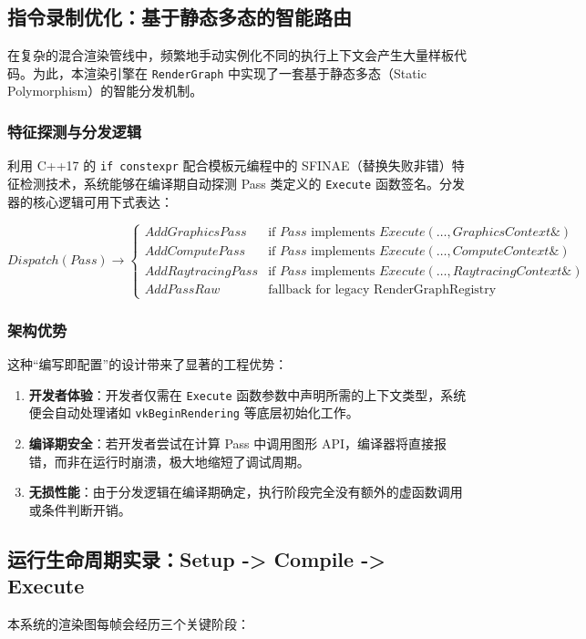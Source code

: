 \subsection{指令录制优化：基于静态多态的智能路由}
在复杂的混合渲染管线中，频繁地手动实例化不同的执行上下文会产生大量样板代码。为此，本渲染引擎在 \texttt{RenderGraph} 中实现了一套基于静态多态（Static Polymorphism）的智能分发机制。

\subsubsection{特征探测与分发逻辑}
利用 C++17 的 \texttt{if constexpr} 配合模板元编程中的 SFINAE（替换失败非错）特征检测技术，系统能够在编译期自动探测 Pass 类定义的 \texttt{Execute} 函数签名。分发器的核心逻辑可用下式表达：

\begin{equation}
    Dispatch(Pass) \rightarrow 
    \begin{cases} 
    AddGraphicsPass & \text{if } Pass \text{ implements } Execute(\dots, GraphicsContext\&) \\
    AddComputePass & \text{if } Pass \text{ implements } Execute(\dots, ComputeContext\&) \\
    AddRaytracingPass & \text{if } Pass \text{ implements } Execute(\dots, RaytracingContext\&) \\
    AddPassRaw & \text{fallback for legacy RenderGraphRegistry}
    \end{cases}
\end{equation}

\subsubsection{架构优势}
这种“编写即配置”的设计带来了显著的工程优势：
\begin{enumerate}
    \item \textbf{开发者体验}：开发者仅需在 \texttt{Execute} 函数参数中声明所需的上下文类型，系统便会自动处理诸如 \texttt{vkBeginRendering} 等底层初始化工作。
    \item \textbf{编译期安全}：若开发者尝试在计算 Pass 中调用图形 API，编译器将直接报错，而非在运行时崩溃，极大地缩短了调试周期。
    \item \textbf{无损性能}：由于分发逻辑在编译期确定，执行阶段完全没有额外的虚函数调用或条件判断开销。
\end{enumerate}

\subsection{运行生命周期实录：Setup -> Compile -> Execute}
本系统的渲染图每帧会经历三个关键阶段：

